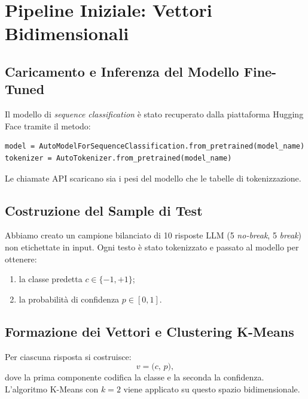 \documentclass[a4paper,11pt]{article}
\begin{document}
\section{Pipeline Iniziale: Vettori Bidimensionali}
\subsection{Caricamento e Inferenza del Modello Fine-Tuned}
Il modello di \textit{sequence classification} è stato recuperato dalla piattaforma Hugging Face tramite il metodo:
\begin{lstlisting}
model = AutoModelForSequenceClassification.from_pretrained(model_name)
tokenizer = AutoTokenizer.from_pretrained(model_name)
\end{lstlisting}
Le chiamate API scaricano sia i pesi del modello che le tabelle di tokenizzazione.

\subsection{Costruzione del Sample di Test}
Abbiamo creato un campione bilanciato di 10 risposte LLM (5 \emph{no-break}, 5 \emph{break}) non etichettate in input. Ogni testo è stato tokenizzato e passato al modello per ottenere:
\begin{enumerate}
  \item la classe predetta \(c\in\{-1,+1\}\);
  \item la probabilità di confidenza \(p\in[0,1]\).
\end{enumerate}

\subsection{Formazione dei Vettori e Clustering K-Means}
Per ciascuna risposta si costruisce:
\begin{equation*}
v = \bigl(c,\,p\bigr),
\end{equation*}
dove la prima componente codifica la classe e la seconda la confidenza. L'algoritmo K-Means con \(k=2\) viene applicato su questo spazio bidimensionale.
\end{document}
